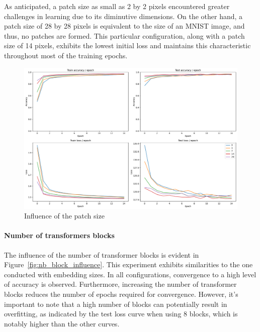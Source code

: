 As anticipated, a patch size as small as 2 by 2 pixels encountered greater challenges in learning due to its diminutive dimensions. On the other hand, a patch size of 28 by 28 pixels is equivalent to the size of an MNIST image, and thus, no patches are formed. This particular configuration, along with a patch size of 14 pixels, exhibits the lowest initial loss and maintains this characteristic throughout most of the training epochs.

\begin{figure}[H]
    \centering
    \includegraphics*[width=\textwidth]{figs/Transformers/patch_size_influence.pdf}
    \caption{Influence of the patch size}
    \label{fig:patch_size_influence}
\end{figure}

\paragraph{Number of transformers blocks}
The influence of the number of transformer blocks is evident in Figure~\ref*{fig:nb_block_influence}. This experiment exhibits similarities to the one conducted with embedding sizes. In all configurations, convergence to a high level of accuracy is observed. Furthermore, increasing the number of transformer blocks reduces the number of epochs required for convergence. However, it's important to note that a high number of blocks can potentially result in overfitting, as indicated by the test loss curve when using 8 blocks, which is notably higher than the other curves.

